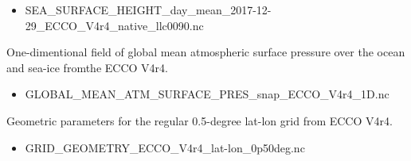 \begin{itemize}
    \item SEA\_SURFACE\_HEIGHT\_day\_mean\_2017-12-29\_ECCO\_V4r4\_native\_llc0090.nc
\end{itemize}

\par One-dimentional field of global mean atmospheric surface pressure over the ocean and sea-ice fromthe ECCO V4r4.
\begin{itemize}
    \item GLOBAL\_MEAN\_ATM\_SURFACE\_PRES\_snap\_ECCO\_V4r4\_1D.nc
\end{itemize}

\par Geometric parameters for the regular 0.5-degree lat-lon grid from ECCO V4r4.
\begin{itemize}
    \item GRID\_GEOMETRY\_ECCO\_V4r4\_lat-lon\_0p50deg.nc
\end{itemize}
